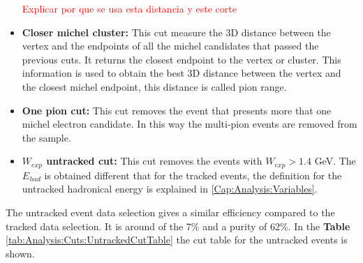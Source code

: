 \begin{itemize}
    \textcolor{red}{Explicar por que se usa esta distancia y este corte}
    
    \item \textbf{Closer michel cluster:} This cut measure the 3D distance between the vertex and the endpoints of all the michel candidates that passed the previous cuts. It returns the closest endpoint to the vertex or cluster. This information is used to obtain the best 3D distance between the vertex and the closest michel endpoint, this distance is called pion range. 
    \item \textbf{One pion cut:} This cut removes the event that presents more that one michel electron candidate. In this way the multi-pion events are removed from the sample.
    \item \textbf{$W_{exp}$ untracked cut:} This cut removes the events with $W_{exp} > 1.4$ GeV. The $E_{had}$ is obtained different that for the tracked events, the definition for the untracked hadronical energy is explained in \ref{Cap:Analysis:Variables}.

\end{itemize}

The untracked event data selection gives a similar efficiency compared to the tracked data selection. It is around of the 7\% and a purity of 62\%. In the \textbf{Table} \ref{tab:Analysis:Cuts:UntrackedCutTable} the cut table for the untracked events is shown. 

